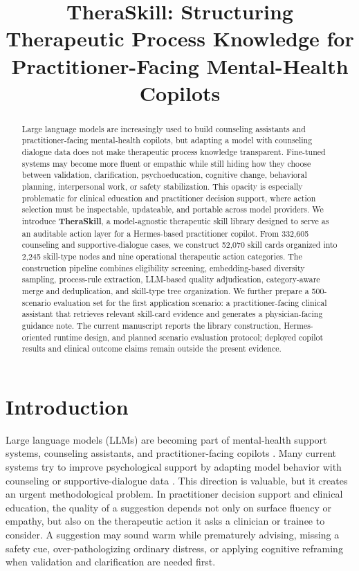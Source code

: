 \documentclass[11pt]{article}
\title{TheraSkill: Structuring Therapeutic Process Knowledge for Practitioner-Facing Mental-Health Copilots}
\author{}
\begin{document}
\maketitle

\begin{abstract}
\noindent
Large language models are increasingly used to build counseling assistants and practitioner-facing mental-health copilots, but adapting a model with counseling dialogue data does not make therapeutic process knowledge transparent. Fine-tuned systems may become more fluent or empathic while still hiding how they choose between validation, clarification, psychoeducation, cognitive change, behavioral planning, interpersonal work, or safety stabilization. This opacity is especially problematic for clinical education and practitioner decision support, where action selection must be inspectable, updateable, and portable across model providers. We introduce \textbf{TheraSkill}, a model-agnostic therapeutic skill library designed to serve as an auditable action layer for a Hermes-based practitioner copilot. From 332,605 counseling and supportive-dialogue cases, we construct 52,070 skill cards organized into 2,245 skill-type nodes and nine operational therapeutic action categories. The construction pipeline combines eligibility screening, embedding-based diversity sampling, process-rule extraction, LLM-based quality adjudication, category-aware merge and deduplication, and skill-type tree organization. We further prepare a 500-scenario evaluation set for the first application scenario: a practitioner-facing clinical assistant that retrieves relevant skill-card evidence and generates a physician-facing guidance note. The current manuscript reports the library construction, Hermes-oriented runtime design, and planned scenario evaluation protocol; deployed copilot results and clinical outcome claims remain outside the present evidence.
\end{abstract}

\section{Introduction}

Large language models (LLMs) are becoming part of mental-health support systems, counseling assistants, and practitioner-facing copilots \citep{stade2024opportunities,nguyen2025counselingbench}. Many current systems try to improve psychological support by adapting model behavior with counseling or supportive-dialogue data \citep{chen2023soulchat,qiu2024smile,zhang2024cpsycoun,xie2025psydt}. This direction is valuable, but it creates an urgent methodological problem. In practitioner decision support and clinical education, the quality of a suggestion depends not only on surface fluency or empathy, but also on the therapeutic action it asks a clinician or trainee to consider. A suggestion may sound warm while prematurely advising, missing a safety cue, over-pathologizing ordinary distress, or applying cognitive reframing when validation and clarification are needed first.
\end{document}
